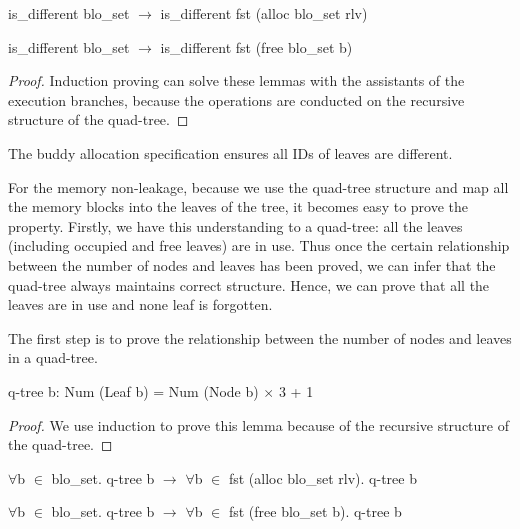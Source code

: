 \documentclass[runningheads]{llncs}
\begin{document}
\begin{lemma}
is\_different blo\_set $\longrightarrow$ is\_different fst (alloc blo\_set rlv)
\end{lemma}

\begin{lemma}
is\_different blo\_set $\longrightarrow$ is\_different fst (free blo\_set b)
\end{lemma}

\begin{proof}
Induction proving can solve these lemmas with the assistants of the execution branches, because the operations are conducted on the recursive structure of the quad-tree.
\end{proof}

\begin{theorem}
The buddy allocation specification ensures all IDs of leaves are different.
\end{theorem}

For the memory non-leakage, because we use the quad-tree structure and map all the memory blocks into the leaves of the tree, it becomes easy to prove the property. Firstly, we have this understanding to a quad-tree: all the leaves (including occupied and free leaves) are in use. Thus once the certain relationship between the number of nodes and leaves has been proved, we can infer that the quad-tree always maintains correct structure. Hence,  we can prove that all the leaves are in use and none leaf is forgotten.

The first step is to prove the relationship between the number of nodes and leaves in a quad-tree.

\begin{lemma}
q-tree b: Num (Leaf b) = Num (Node b) $\times$ 3 + 1
\end{lemma}

\begin{proof}
We use induction  to prove this lemma because of the recursive structure of the quad-tree.
\end{proof}

\begin{lemma}
$\forall$b $\in$ blo\_set. q-tree b $\longrightarrow$ $\forall$b $\in$ fst (alloc blo\_set rlv). q-tree b
\end{lemma}

\begin{lemma}
$\forall$b $\in$ blo\_set. q-tree b $\longrightarrow$ $\forall$b $\in$ fst (free blo\_set b). q-tree b
\end{lemma}
\end{document}

